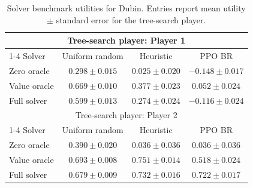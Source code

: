\begin{table}[t]
\centering
\caption{Solver benchmark utilities for Dubin. Entries report mean utility $\pm$ standard error for the tree-search player.}
\label{tab:dubin-solver-benchmarks}
\begin{tabular}{@{}lccc@{}}
\toprule
\multicolumn{4}{c}{Tree-search player: Player 1} \\
\cmidrule(lr){1-4}
Solver & Uniform random & Heuristic & PPO BR \\
\midrule
Zero oracle & $0.298 \pm 0.015$ & $0.025 \pm 0.020$ & $-0.148 \pm 0.017$ \\
Value oracle & $\mathbf{0.669 \pm 0.010}$ & $\mathbf{0.377 \pm 0.023}$ & $\mathbf{0.052 \pm 0.024}$ \\
Full solver & $0.599 \pm 0.013$ & $0.274 \pm 0.024$ & $-0.116 \pm 0.024$ \\
\midrule
\multicolumn{4}{c}{Tree-search player: Player 2} \\
\cmidrule(lr){1-4}
Solver & Uniform random & Heuristic & PPO BR \\
\midrule
Zero oracle & $0.390 \pm 0.020$ & $0.036 \pm 0.036$ & $0.036 \pm 0.036$ \\
Value oracle & $\mathbf{0.693 \pm 0.008}$ & $\mathbf{0.751 \pm 0.014}$ & $0.518 \pm 0.024$ \\
Full solver & $0.679 \pm 0.009$ & $0.732 \pm 0.016$ & $\mathbf{0.722 \pm 0.017}$ \\
\bottomrule
\end{tabular}
\end{table}
